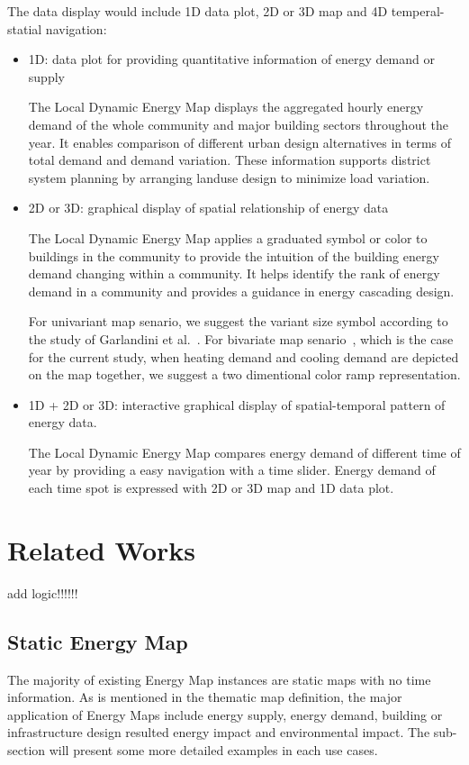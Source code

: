 \documentclass[hidelinks,12pt]{article}
\newcommand{\grey}[1]{\textcolor{black!30}{#1}}
\begin{document}
The data display would include 1D data plot, 2D or 3D map and 4D
temperal-statial navigation:
\begin{itemize}
\item 1D: data plot for providing quantitative information of energy
  demand or supply

  The Local Dynamic Energy Map displays the aggregated hourly energy
  demand of the whole community and major building sectors throughout
  the year. It enables comparison of different urban design
  alternatives in terms of total demand and demand variation. These
  information supports district system planning by arranging landuse
  design to minimize load variation.

\item 2D or 3D: graphical display of spatial relationship of energy data

  The Local Dynamic Energy Map applies a graduated symbol or color to
  buildings in the community to provide the intuition of the building
  energy demand changing within a community. It helps identify the
  rank of energy demand in a community and provides a guidance in
  energy cascading design.
    
  For univariant map senario, we suggest the variant size symbol
  according to the study of Garlandini et
  al.~\cite{Garlandini2009}. For bivariate map
  senario~\cite{bimapWiki}, which is the case for the current study,
  when heating demand and cooling demand are depicted on the map
  together, we suggest a two dimentional color ramp representation.

\item 1D + 2D or 3D: interactive graphical display of spatial-temporal
  pattern of energy data.
  
  The Local Dynamic Energy Map compares energy demand of different
  time of year by providing a easy navigation with a time
  slider. Energy demand of each time spot is expressed with 2D or 3D
  map and 1D data plot.
\end{itemize}

\section{Related Works}
\grey{add logic}!!!!!!
\subsection{Static Energy Map}
The majority of existing Energy Map instances are static maps with no
time information. As is mentioned in the thematic map definition, the
major application of Energy Maps include energy supply, energy demand,
building or infrastructure design resulted energy impact and
environmental impact. The sub-section will present some more detailed
examples in each use cases.
\end{document}
